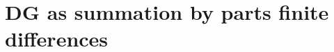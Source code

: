 \documentclass[compress]{beamer}
\theoremstyle{plain}
\renewcommand{\note}[1]{\textcolor{red}{{#1}}}
\begin{document}





%


%

\section{DG as summation by parts finite differences }
\end{document}
